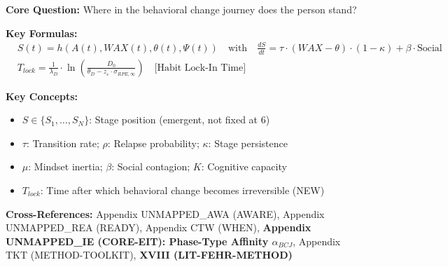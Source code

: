 \begin{tcolorbox}[colback=blue!5!white, colframe=blue!75!black,
    title=Quick Reference: CORE-STAGE]

\textbf{Core Question:} Where in the behavioral change journey does the person stand?

\textbf{Key Formulas:}
\begin{align}
&\boxed{S(t) = h(A(t), WAX(t), \theta(t), \Psi(t)) \quad \text{with} \quad \frac{dS}{dt} = \tau \cdot (WAX - \theta) \cdot (1-\kappa) + \beta \cdot \text{Social}} \\[3pt]
&\boxed{T_{lock} = \frac{1}{\lambda_D} \cdot \ln\left(\frac{D_0}{\theta_D - z_\varepsilon \cdot \sigma_{RPE,\infty}}\right) \quad \text{[Habit Lock-In Time]}}
\end{align}

\textbf{Key Concepts:}
\begin{itemize}[nosep]
\item $S \in \{S_1, \ldots, S_N\}$: Stage position (emergent, not fixed at 6)
\item $\tau$: Transition rate; $\rho$: Relapse probability; $\kappa$: Stage persistence
\item $\mu$: Mindset inertia; $\beta$: Social contagion; $K$: Cognitive capacity
\item $T_{lock}$: Time after which behavioral change becomes irreversible (NEW)
\end{itemize}

\textbf{Cross-References:} Appendix UNMAPPED_AWA (AWARE), Appendix UNMAPPED_REA (READY), Appendix CTW (WHEN), \textbf{Appendix UNMAPPED_IE (CORE-EIT): Phase-Type Affinity $\alpha_{BCJ}$}, Appendix TKT (METHOD-TOOLKIT), \textbf{XVIII (LIT-FEHR-METHOD)}
\end{tcolorbox}


